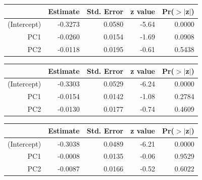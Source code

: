 \documentclass[a4paper,12pt]{Latex/Classes/PhDthesisPSnPDF}
\begin{document}
\begin{center}
\begin{table}[ht]
\centering
\begin{tabular}{rrrrr}
  \hline
 & Estimate & Std. Error & z value & Pr($>$$|$z$|$) \\ 
  \hline
(Intercept) & -0.3273 & 0.0580 & -5.64 & 0.0000 \\ 
  PC1 & -0.0260 & 0.0154 & -1.69 & 0.0908 \\ 
  PC2 & -0.0118 & 0.0195 & -0.61 & 0.5438 \\ 
   \hline
\end{tabular}
\end{table}\end{center}

\begin{center}
\begin{table}[ht]
\centering
\begin{tabular}{rrrrr}
  \hline
 & Estimate & Std. Error & z value & Pr($>$$|$z$|$) \\ 
  \hline
(Intercept) & -0.3303 & 0.0529 & -6.24 & 0.0000 \\ 
  PC1 & -0.0154 & 0.0142 & -1.08 & 0.2784 \\ 
  PC2 & -0.0130 & 0.0177 & -0.74 & 0.4609 \\ 
   \hline
\end{tabular}
\end{table}\end{center}

\newpage

\begin{center}
\begin{table}[ht]
\centering
\begin{tabular}{rrrrr}
  \hline
 & Estimate & Std. Error & z value & Pr($>$$|$z$|$) \\ 
  \hline
(Intercept) & -0.3038 & 0.0489 & -6.21 & 0.0000 \\ 
  PC1 & -0.0008 & 0.0135 & -0.06 & 0.9529 \\ 
  PC2 & -0.0087 & 0.0166 & -0.52 & 0.6022 \\ 
   \hline
\end{tabular}
\end{table}\end{center}
\end{document}
